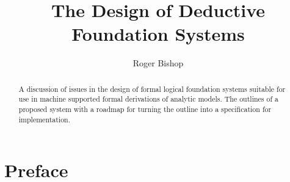\documentclass{rbjk}
\begin{document}
                                                                                   
\begin{article}
\begin{opening}  
\title{The Design of Deductive Foundation Systems}
\author{Roger Bishop }

\begin{abstract}
A discussion of issues in the design of formal logical foundation systems suitable for use in machine supported formal derivations of analytic models.
The outlines of a proposed system with a roadmap for turning the outline into a specification for implementation. 
\end{abstract}
\end{opening}

\setcounter{tocdepth}{4}
{\parskip-0pt\tableofcontents}

\section{Preface}

%
%

\end{article}
\end{document}

